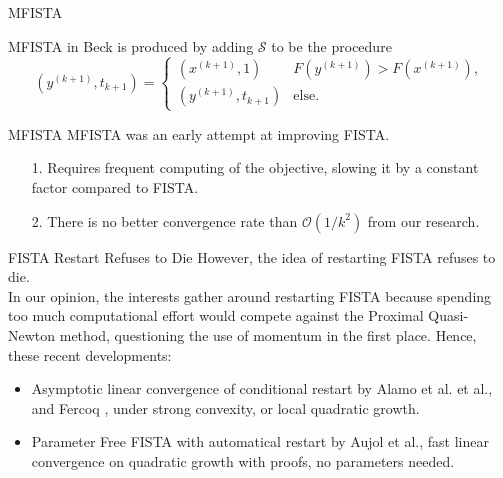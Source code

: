 \documentclass[11pt]{beamer}
\theoremstyle{definition}
\begin{document}
    \begin{frame}{MFISTA}
        \begin{algorithm}[H]
            \begin{tiny}
                \begin{algorithmic}[1]
                    \ENDFOR
                \end{algorithmic}
                \caption{Generic FISTA}    
            \end{tiny}
        \end{algorithm}
        MFISTA in Beck\cite{beck_fast_2009} is produced by adding $\mathcal S$ to be the procedure
        \[
            (y^{(k + 1)}, t_{k + 1}) = \begin{cases}
                (x^{(k + 1)}, 1) & F(y^{(k + 1)}) > F(x^{(k + 1)}),
                \\
                (y^{(k + 1)}, t_{k + 1}) & \text{else}. 
            \end{cases}
        \]
    \end{frame}
    \begin{frame}{MFISTA}
        MFISTA was an early attempt at improving FISTA. 
        
        \begin{itemize}
            \item [1.] Requires frequent computing of the objective, slowing it by a constant factor compared to FISTA. 
            \item [2.] There is no better convergence rate than $\mathcal O(1/k^2)$ from our research. 
        \end{itemize}
    \end{frame}
    \begin{frame}{FISTA Restart Refuses to Die}
        However, the idea of restarting FISTA refuses to die. 
        \\
        In our opinion, the interests gather around restarting FISTA because spending too much computational effort would compete against the Proximal Quasi-Newton method, questioning the use of momentum in the ﬁrst place. Hence, these recent developments:
        \begin{itemize}
            \item Asymptotic linear convergence of conditional restart by Alamo et al. \cite{alamo_restart_2019}\cite[text]{alamo_gradient_2019} et al., and Fercoq \cite{fercoq_adaptive_2019}, under strong convexity, or local quadratic growth. 
            \item Parameter Free FISTA with automatical restart by Aujol et al.\cite{aujol_parameter-free_2023}, fast linear convergence on quadratic growth with proofs, no parameters needed.
        \end{itemize}
    \end{frame}
\end{document}
